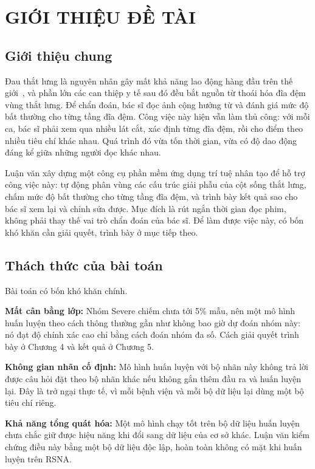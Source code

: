 \chapter{GIỚI THIỆU ĐỀ TÀI}

\section{Giới thiệu chung}

Đau thắt lưng là nguyên nhân gây mất khả năng lao động hàng đầu trên thế giới~\cite{gbd2021lowbackpain}, và phần lớn các can thiệp y tế sau đó đều bắt nguồn từ thoái hóa đĩa đệm vùng thắt lưng. Để chẩn đoán, bác sĩ đọc ảnh cộng hưởng từ và đánh giá mức độ bất thường cho từng tầng đĩa đệm. Công việc này hiện vẫn làm thủ công: với mỗi ca, bác sĩ phải xem qua nhiều lát cắt, xác định từng đĩa đệm, rồi cho điểm theo nhiều tiêu chí khác nhau. Quá trình đó vừa tốn thời gian, vừa có độ dao động đáng kể giữa những người đọc khác nhau.

Luận văn xây dựng một công cụ phần mềm ứng dụng trí tuệ nhân tạo để hỗ trợ công việc này: tự động phân vùng các cấu trúc giải phẫu của cột sống thắt lưng, chấm mức độ bất thường cho từng tầng đĩa đệm, và trình bày kết quả sao cho bác sĩ xem lại và chỉnh sửa được. Mục đích là rút ngắn thời gian đọc phim, không phải thay thế vai trò chẩn đoán của bác sĩ. Để làm được việc này, có bốn khó khăn cần giải quyết, trình bày ở mục tiếp theo.

\section{Thách thức của bài toán}

Bài toán có bốn khó khăn chính.

\textbf{Mất cân bằng lớp:} Nhóm Severe chiếm chưa tới 5\% mẫu, nên một mô hình huấn luyện theo cách thông thường gần như không bao giờ dự đoán nhóm này: nó đạt độ chính xác cao chỉ bằng cách đoán nhóm đa số. Cách giải quyết trình bày ở Chương 4 và kết quả ở Chương 5.

\textbf{Không gian nhãn cố định:} Mô hình huấn luyện với bộ nhãn này không trả lời được câu hỏi đặt theo bộ nhãn khác nếu không gắn thêm đầu ra và huấn luyện lại. Đây là trở ngại thực tế, vì mỗi bệnh viện và mỗi bộ dữ liệu lại dùng một bộ tiêu chí riêng.

\textbf{Khả năng tổng quát hóa:} Một mô hình chạy tốt trên bộ dữ liệu huấn luyện chưa chắc giữ được hiệu năng khi đổi sang dữ liệu của cơ sở khác. Luận văn kiểm chứng điều này bằng một bộ dữ liệu độc lập, hoàn toàn không có mặt khi huấn luyện trên RSNA.

